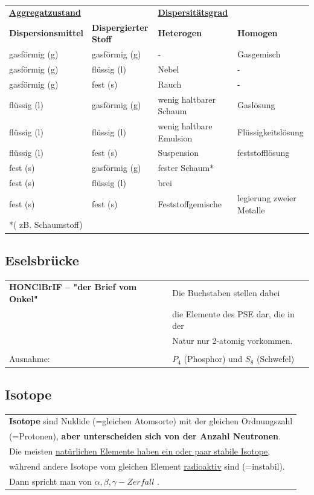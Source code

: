 {\footnotesize
	\begin{tabular}[\columnwidth]{l l | l l}
			\underline{\textbf{Aggregatzustand}} 	&     					& \underline{\textbf{Dispersitätsgrad}}    &   \\ 
			\textbf{Dispersionsmittel}  	& \textbf{Dispergierter Stoff}	& \textbf{Heterogen}   		& \textbf{Homogen}       \\
			gasförmig (g) 		& gasförmig (g)        	& -          		& Gasgemisch        \\
			gasförmig (g)		& flüssig (l)			& Nebel				& -		\\
			gasförmig (g)		& fest (s)				& Rauch				& -		\\
			flüssig (l)			& gasförmig (g) 		& wenig haltbarer Schaum	& Gaslösung		\\
			flüssig (l)			& flüssig (l) 			& wenig haltbare Emulsion				& Flüssigkeitslösung		\\
			flüssig (l)			& fest (s) 				& Suspension				& feststofflösung	\\
			fest (s)			& gasförmig (g) 		& fester Schaum* 			& 		\\
			fest (s)			& flüssig (l) 			& brei				&		\\
			fest (s)			& fest (s) 				& Feststoffgemische				& legierung zweier Metalle	\\
			*( zB. Schaumstoff) 	&				&						& \\
	\end{tabular} 
}
		
\subsection{Eselsbrücke}

\begin{tabular}{ll} 
	\textbf{HONClBrIF – "der Brief vom Onkel"}   &  Die Buchstaben stellen dabei \\
	& die Elemente des PSE dar, die in der \\
	& Natur nur 2-atomig vorkommen. \\ & \\
	Ausnahme: & $P_4$ (Phosphor) und $S_8$ (Schwefel)  \\
\end{tabular}

\subsection{Isotope}
\begin{tabular}{l}
	\textbf{Isotope} sind Nuklide (=gleichen Atomsorte) mit der gleichen Ordnungszahl \\ (=Protonen),
	\textbf{aber unterscheiden sich von der Anzahl Neutronen}. \\ 
	Die meisten \underline{natürlichen Elemente haben ein oder paar stabile Isotope,} \\
	während andere Isotope vom gleichen Element \underline{radioaktiv} sind (=instabil). \\ Dann spricht man von $\alpha , \beta , \gamma -Zerfall$ . \\
	
\end{tabular}


